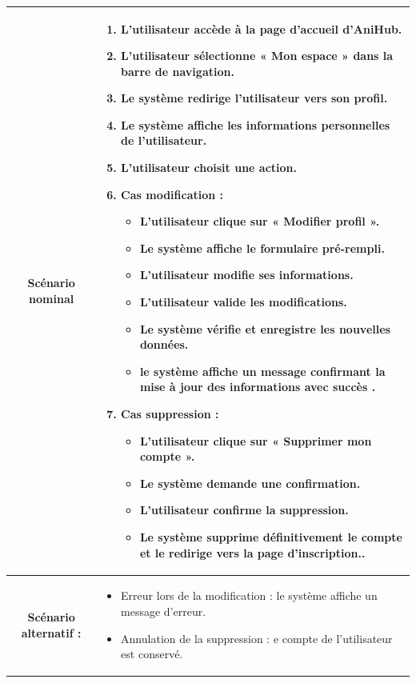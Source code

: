 \begin{longtable}{|c|p{11cm}|}
\cellcolor{coloranihub}\textbf{Scénario nominal } &
\begin{enumerate}
\item L’utilisateur accède à la page d’accueil d’AniHub.
\item L’utilisateur sélectionne « Mon espace » dans la barre de navigation.
\item Le système redirige l’utilisateur vers son profil.
\item Le système affiche les informations personnelles de l’utilisateur.
\item L’utilisateur choisit une action.
\item Cas modification :
\begin{itemize}
\item L’utilisateur clique sur « Modifier profil ».
\item Le système affiche le formulaire pré-rempli.
\item L’utilisateur modifie ses informations.
\item L’utilisateur valide les modifications.
\item Le système vérifie et enregistre les nouvelles données. 
\item le système affiche un message confirmant la mise à jour des informations avec succès . 
\end{itemize}
\item Cas suppression :
\begin{itemize}
\item L’utilisateur clique sur « Supprimer mon compte ».
\item Le système demande une confirmation.
\item L’utilisateur confirme la suppression.
\item Le système supprime définitivement le compte et le redirige vers la page d’inscription..
\end{itemize}
\end{enumerate} \\
\hline

\cellcolor{coloranihub}\textbf{Scénario alternatif :} &
\begin{itemize}
\item Erreur lors de la modification : le système affiche un message d’erreur.
\item Annulation de la suppression : e compte de l’utilisateur est conservé.
\end{itemize} \\
\hline

\end{longtable}






